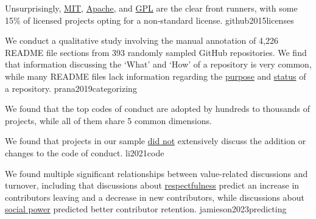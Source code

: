 \documentclass{article}
\begin{document}
  {Unsurprisingly, \ul{MIT}, \ul{Apache}, and \ul{GPL} are the clear front runners, with some 15\% of licensed projects opting for a non-standard license.}
  {github2015licenses}



  {We conduct a qualitative study involving the manual annotation of 4,226 README file sections from 393 randomly sampled GitHub repositories. We find that information discussing the `What' and `How' of a repository is very common, while many README files lack information regarding the \ul{purpose} and \ul{status} of a repository.}
  {prana2019categorizing}




  {We found that the top codes of conduct are adopted by hundreds to thousands of projects, while all of them share 5 common dimensions.}
  {}

  {We found that projects in our sample \ul{did not} extensively discuss the addition or changes to the code of conduct.}
  {li2021code}

  {We found multiple significant relationships between value-related discussions and turnover, including that discussions about \ul{respectfulness} predict an increase in contributors leaving and a decrease in new contributors, while discussions about \ul{social power} predicted better contributor retention.}
  {jamieson2023predicting}
\end{document}
